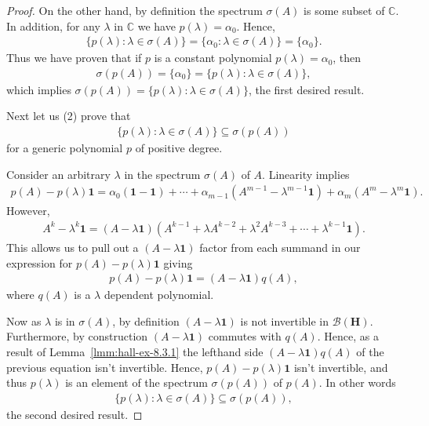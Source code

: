 \begin{proof}
On the other hand, by definition the spectrum $\sigma(A)$ is some subset of $\mathbb{C}$. In addition, for any $\lambda$ in $\mathbb{C}$ we have $p(\lambda) = \alpha_0$. Hence,
\begin{align}
    \{ p(\lambda) : \lambda \in \sigma(A) \} = \{ \alpha_0 : \lambda \in \sigma(A) \} = \{ \alpha_0 \}.
\end{align}
Thus we have proven that if $p$ is a constant polynomial $p(\lambda) = \alpha_0$, then
\begin{align}
    \sigma(p(A)) = \{ \alpha_0 \} = \{ p(\lambda) : \lambda \in \sigma(A) \},
\end{align}
which implies $\sigma(p(A)) = \{ p(\lambda) : \lambda \in \sigma(A) \}$, the first desired result.

Next let us (2) prove that
\begin{align}
    \{ p(\lambda) : \lambda \in \sigma(A) \} \subseteq \sigma(p(A))
\end{align}
for a generic polynomial $p$ of positive degree.

Consider an arbitrary $\lambda$ in the spectrum $\sigma(A)$ of $A$. Linearity implies
\begin{align}
    p(A) - p(\lambda) \mathbf{1} = \alpha_0 (\mathbf{1} - \mathbf{1}) + \cdots + \alpha_{m-1} (A^{m - 1} - \lambda^{m - 1} \mathbf{1}) + \alpha_m (A^m - \lambda^m \mathbf{1}).
\end{align}
However,
\begin{align}
    A^k - \lambda^k \mathbf{1} = (A - \lambda \mathbf{1}) (A^{k-1} + \lambda A^{k-2} + \lambda^2 A^{k-3} + \cdots + \lambda^{k-1} \mathbf{1}).
\end{align}
This allows us to pull out a $(A - \lambda \mathbf{1})$ factor from each summand in our expression for $p(A) - p(\lambda) \mathbf{1}$ giving
\begin{align}
    p(A) - p(\lambda) \mathbf{1} = (A - \lambda \mathbf{1}) q(A),
\end{align}
where $q(A)$ is a $\lambda$ dependent polynomial.

Now as $\lambda$ is in $\sigma(A)$, by definition $(A - \lambda \mathbf{1})$ is not invertible in $\mathcal{B}(\mathbf{H})$. Furthermore, by construction $(A - \lambda \mathbf{1})$ commutes with $q(A)$. Hence, as a result of Lemma~\ref{lmm:hall-ex-8.3.1} the lefthand side $(A - \lambda \mathbf{1}) q(A)$ of the previous equation isn't invertible. Hence, $p(A) - p(\lambda) \mathbf{1}$ isn't invertible, and thus $p(\lambda)$ is an element of the spectrum $\sigma(p(A))$ of $p(A)$. In other words
\begin{align}
    \{ p(\lambda) : \lambda \in \sigma(A) \} \subseteq \sigma(p(A)),
\end{align}
the second desired result.


\end{proof}
